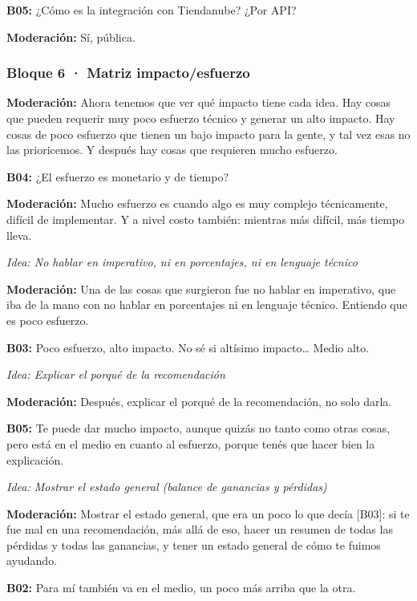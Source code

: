\noindent\textbf{B05:} ¿Cómo es la integración con Tiendanube? ¿Por API?

\noindent\textbf{Moderación:} Sí, pública.

\subsubsection*{Bloque 6 · Matriz impacto/esfuerzo}

\noindent\textbf{Moderación:} Ahora tenemos que ver qué impacto tiene cada idea. Hay cosas que pueden requerir muy poco esfuerzo técnico y generar un alto impacto. Hay cosas de poco esfuerzo que tienen un bajo impacto para la gente, y tal vez esas no las prioricemos. Y después hay cosas que requieren mucho esfuerzo.

\noindent\textbf{B04:} ¿El esfuerzo es monetario y de tiempo?

\noindent\textbf{Moderación:} Mucho esfuerzo es cuando algo es muy complejo técnicamente, difícil de implementar. Y a nivel costo también: mientras más difícil, más tiempo lleva.

\medskip\noindent\textit{Idea: No hablar en imperativo, ni en porcentajes, ni en lenguaje técnico}

\noindent\textbf{Moderación:} Una de las cosas que surgieron fue no hablar en imperativo, que iba de la mano con no hablar en porcentajes ni en lenguaje técnico. Entiendo que es poco esfuerzo.

\noindent\textbf{B03:} Poco esfuerzo, alto impacto. No sé si altísimo impacto… Medio alto.

\medskip\noindent\textit{Idea: Explicar el porqué de la recomendación}

\noindent\textbf{Moderación:} Después, explicar el porqué de la recomendación, no solo darla.

\noindent\textbf{B05:} Te puede dar mucho impacto, aunque quizás no tanto como otras cosas, pero está en el medio en cuanto al esfuerzo, porque tenés que hacer bien la explicación.

\medskip\noindent\textit{Idea: Mostrar el estado general (balance de ganancias y pérdidas)}

\noindent\textbf{Moderación:} Mostrar el estado general, que era un poco lo que decía [B03]: si te fue mal en una recomendación, más allá de eso, hacer un resumen de todas las pérdidas y todas las ganancias, y tener un estado general de cómo te fuimos ayudando.

\noindent\textbf{B02:} Para mí también va en el medio, un poco más arriba que la otra.

